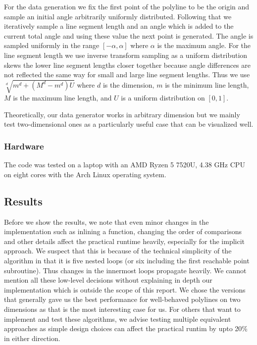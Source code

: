 For the data generation we fix the first point of the polyline to be the origin and sample an initial angle arbitrarily uniformly distributed. Following that we iteratively sample a line segment length and an angle which is added to the current total angle and using these value the next point is generated. The angle is sampled uniformly in the range \([-\alpha, \alpha]\) where \(\alpha\) is the maximum angle. For the line segment length we use inverse transform sampling as a uniform distribution skews the lower line segment lengths closer together because angle differences are not reflected the same way for small and large line segment lengths. Thus we use \(\sqrt[d]{m^d + (M^d - m^d) U}\) where \(d\) is the dimension, \(m\) is the minimum line length, \(M\) is the maximum line length, and \(U\) is a uniform distribution on \([0,1]\).

Theoretically, our data generator works in arbitrary dimension but we mainly test two-dimensional ones as a particularly useful case that can be visualized well. 

\subsubsection{Hardware}
\label{subsubsec:hardware}
The code was tested on a laptop with an AMD Ryzen 5 7520U, 4.38 GHz CPU on eight cores with the Arch Linux operating system.


\subsection{Results}
\label{subsec:results}
Before we show the results, we note that even minor changes in the implementation such as inlining a function, changing the order of comparisons and other details affect the practical runtime heavily, especially for the implicit approach. We suspect that this is because of the technical simplicity of the algorithm in that it is five nested loops (or six including the first reachable point subroutine). Thus changes in the innermost loops propagate heavily. We cannot mention all these low-level decisions without explaining in depth our implementation which is outside the scope of this report. We chose the versions that generally gave us the best performance for well-behaved polylines on two dimensions as that is the most interesting case for us. For others that want to implement and test these algorithms, we advise testing multiple equivalent approaches as simple design choices can affect the practical runtim by upto 20\% in either direction. 

